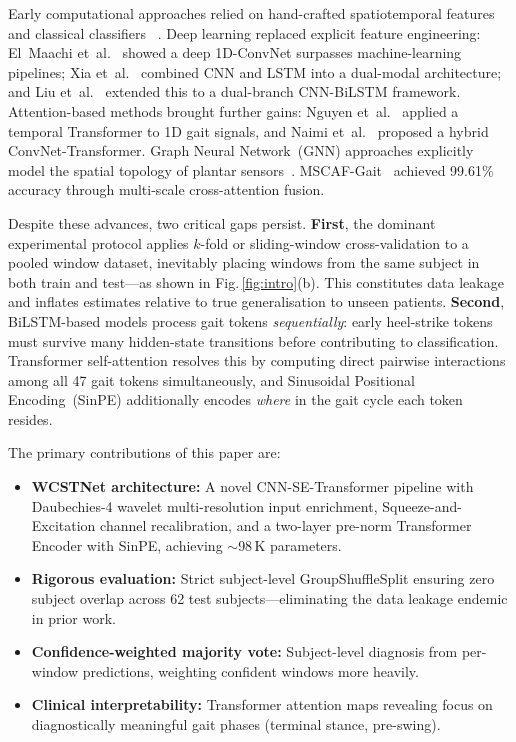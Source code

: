 \documentclass[lettersize,journal]{IEEEtran}
\begin{document}
Early computational approaches relied on hand-crafted
spatiotemporal features and classical classifiers~%
\cite{alam2017vgrf,ertugrul2016lbp,prabhu2020}.
Deep learning replaced explicit feature engineering: El~Maachi
et~al.~\cite{maachi2020convnet} showed a deep 1D-ConvNet surpasses
machine-learning pipelines; Xia et~al.~\cite{xia2020dcalstm} combined
CNN and LSTM into a dual-modal architecture; and Liu et~al.~%
\cite{liu2021dualbranch} extended this to a dual-branch CNN-BiLSTM
framework.
Attention-based methods brought further gains:
Nguyen et~al.~\cite{nguyen2022transformer} applied a temporal
Transformer to 1D gait signals, and Naimi et~al.~\cite{naimi2023hct}
proposed a hybrid ConvNet-Transformer.
Graph Neural Network~(GNN) approaches explicitly model the spatial
topology of plantar sensors~\cite{zhong2022rfdgad, wang2023astdgnn,
wang2026msadgnn, wang2025gld2gnn}.
MSCAF-Gait~\cite{yuan2025mscaf} achieved 99.61\% accuracy through
multi-scale cross-attention fusion.

Despite these advances, two critical gaps persist.
\textbf{First}, the dominant experimental protocol applies $k$-fold
or sliding-window cross-validation to a pooled window dataset,
inevitably placing windows from the same subject in both train and
test—as shown in Fig.\,\ref{fig:intro}(b).
This constitutes data leakage and inflates estimates relative to true
generalisation to unseen patients.
\textbf{Second}, BiLSTM-based models process gait tokens
\emph{sequentially}: early heel-strike tokens must survive many
hidden-state transitions before contributing to classification.
Transformer self-attention resolves this by computing direct pairwise
interactions among all 47 gait tokens simultaneously, and Sinusoidal
Positional Encoding~(SinPE) additionally encodes \emph{where} in
the gait cycle each token resides.

The primary contributions of this paper are:
\begin{itemize}
    \item \textbf{WCSTNet architecture:} A novel CNN-SE-Transformer
    pipeline with Daubechies-4 wavelet multi-resolution input
    enrichment, Squeeze-and-Excitation channel recalibration,
    and a two-layer pre-norm Transformer Encoder with SinPE,
    achieving ${\sim}$98\,K parameters.
    \item \textbf{Rigorous evaluation:} Strict subject-level
    GroupShuffleSplit ensuring zero subject overlap across 62 test
    subjects—eliminating the data leakage endemic in prior work.
    \item \textbf{Confidence-weighted majority vote:} Subject-level
    diagnosis from per-window predictions, weighting confident
    windows more heavily.
    \item \textbf{Clinical interpretability:} Transformer attention
    maps revealing focus on diagnostically meaningful gait phases
    (terminal stance, pre-swing).
\end{itemize}
\end{document}
